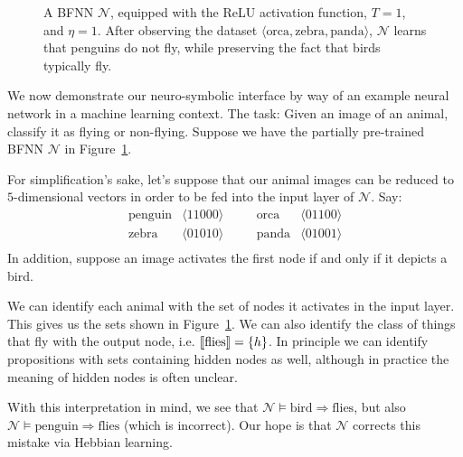 \documentclass[letterpaper]{article}
\theoremstyle{definition}
\newcommand{\semantics}[1]{[\![\mbox{\em $ #1 $\/}]\!]}
\newcommand{\set}[1]{\{ #1 \}}
\newcommand{\Net}{\mathcal{N}}
\begin{document}
\begin{figure}
{
}
\caption{A BFNN $\Net$, equipped with the ReLU activation function, $T = 1$, and $\eta = 1$.  After observing the dataset $\langle \textrm{orca}, \textrm{zebra}, \textrm{panda} \rangle$, $\Net$ learns that penguins do not fly, while preserving the fact that birds typically fly.}
\label{fig:full-example}
\end{figure}

We now demonstrate our neuro-symbolic interface by way of an example neural network in a machine learning context.  The task: Given an image of an animal, classify it as flying or non-flying.  Suppose we have the partially pre-trained BFNN $\Net$ in  Figure~\ref{fig:full-example}.  

For simplification's sake, let's suppose that our animal images can be reduced to $5$-dimensional vectors in order to be fed into the input layer of $\Net$.  Say:
\[
\begin{array}{llcll}
\textrm{penguin} & \langle 1 1 0 0 0 \rangle & \quad & 
\textrm{orca} & \langle 0 1 1 0 0 \rangle \\
\textrm{zebra} & \langle 0 1 0 1 0 \rangle & \quad & 
\textrm{panda} & \langle 0 1 0 0 1 \rangle \\
\end{array}
\]
In addition, suppose an image activates the first node if and only if it depicts a bird.

We can identify each animal with the set of nodes it activates in the input layer.  This gives us the sets shown in Figure~\ref{fig:full-example}.  We can also identify the class of things that fly with the output node, i.e. $\semantics{\textup{flies}} = \set{h}$.  In principle we can identify propositions with sets containing hidden nodes as well, although in practice the meaning of hidden nodes is often unclear.

With this interpretation in mind, we see that $\Net \models \textrm{bird} \Rightarrow \textrm{flies}$, but also $\Net \models \textrm{penguin} \Rightarrow \textrm{flies}$ (which is incorrect).  Our hope is that $\Net$ corrects this mistake via Hebbian learning.
\end{document}
